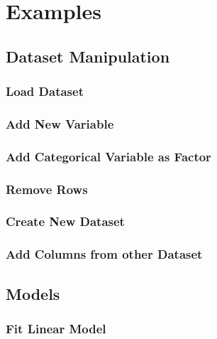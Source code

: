 \section{Examples}

\subsection{Dataset Manipulation}

\subsubsection{Load Dataset}


\subsubsection{Add New Variable}


\subsubsection{Add Categorical Variable as Factor}


\subsubsection{Remove Rows}


\subsubsection{Create New Dataset}


\subsubsection{Add Columns from other Dataset}


\subsection{Models}

\subsubsection{Fit Linear Model}


